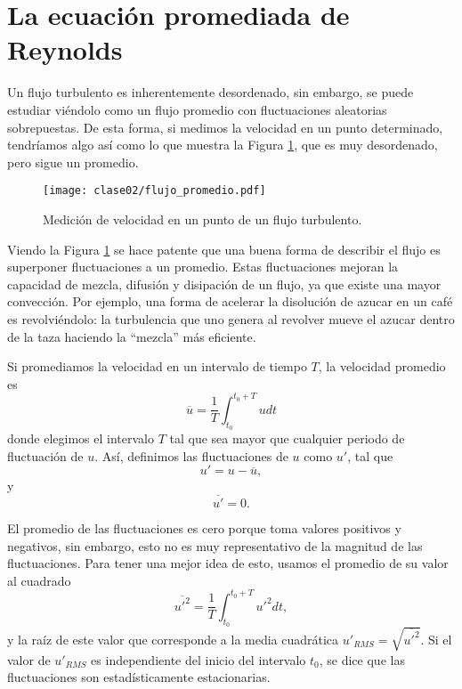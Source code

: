 \section*{La ecuación promediada de Reynolds}

Un flujo turbulento es inherentemente desordenado, sin embargo, se puede estudiar viéndolo como un flujo promedio con fluctuaciones aleatorias sobrepuestas.
De esta forma, si medimos la velocidad en un punto determinado, tendríamos algo así como lo que muestra la Figura \ref{fig:flujo_promedio}, que es muy desordenado, pero sigue un promedio.

\begin{figure}[h!]
\centering
\texttt{[image: clase02/flujo\_promedio.pdf]}
\caption{Medición de velocidad en un punto de un flujo turbulento.}
\label{fig:flujo_promedio}
\end{figure}

Viendo la Figura \ref{fig:flujo_promedio} se hace patente que una buena forma de describir el flujo es superponer fluctuaciones a un promedio.
Estas fluctuaciones mejoran la capacidad de mezcla, difusión y disipación de un flujo, ya que existe una mayor convección.
Por ejemplo, una forma de acelerar la disolución de azucar en un café es revolviéndolo: la turbulencia que uno genera al revolver mueve el azucar dentro de la taza haciendo la ``mezcla'' más eficiente.

Si promediamos la velocidad en un intervalo de tiempo $T$, la velocidad promedio es
%
\begin{equation}
\overline{u} = \frac{1}{T}\int_{t_0}^{t_0+T}udt
\end{equation}
%
donde elegimos el intervalo $T$ tal que sea mayor que cualquier periodo de fluctuación de $u$.
Así, definimos las fluctuaciones de $u$ como $u'$, tal que 
%
\begin{equation} \label{eq:fluctuacion}
u'=u-\overline{u},
\end{equation}
%
y
\begin{equation}
\overline{u'} = 0.
\end{equation}

El promedio de las fluctuaciones es cero porque toma valores positivos y negativos, sin embargo, esto no es muy representativo de la magnitud de las fluctuaciones. 
Para tener una mejor idea de esto, usamos el promedio de su valor al cuadrado
%
\begin{equation}
\overline{u'^2} = \frac{1}{T}\int_{t_0}^{t_0+T} u'^2dt,
\end{equation}
%
y la raíz de este valor que corresponde a la media cuadrática $u'_{RMS} = \sqrt{\overline{u'^2}}$.
Si el valor de $u'_{RMS}$ es independiente del inicio del intervalo $t_0$, se dice que las fluctuaciones son estadísticamente estacionarias.

